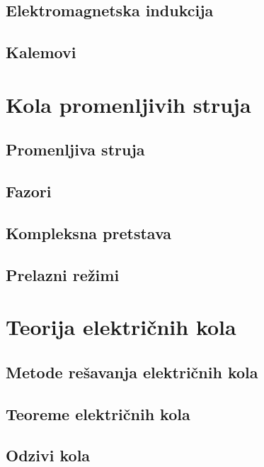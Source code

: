 \subsection{Elektromagnetska indukcija}

\subsection{Kalemovi}

\section{Kola promenljivih struja}

\subsection{Promenljiva struja}

\subsection{Fazori}

\subsection{Kompleksna pretstava}

\subsection{Prelazni re\v zimi}

\section{Teorija elektri\v cnih kola}

\subsection{Metode re\v savanja elektri\v cnih kola}

\subsection{Teoreme elektri\v cnih kola}

\subsection{Odzivi kola}
